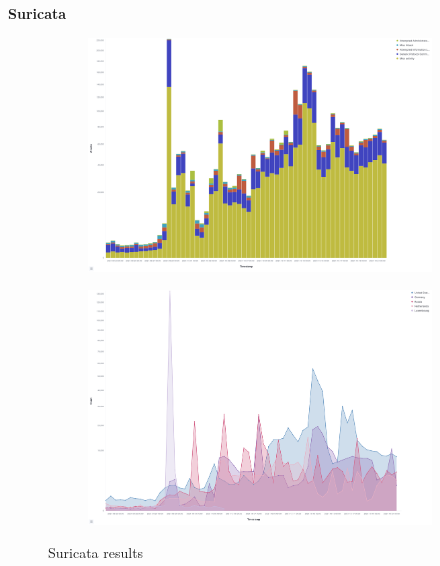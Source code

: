 \textbf{Suricata}

\begin{figure}
    \centering

    \begin{subfigure}[b]{0.49\textwidth}
        \centering
        \includegraphics[width=\textwidth]{figures/tpot-suricata-attacks.png}
        \caption{}
        \label{fig:tpot-suricata-attacks}
    \end{subfigure}
    \hfill
    \begin{subfigure}[b]{0.49\textwidth}
        \centering
        \includegraphics[width=\textwidth]{figures/tpot-suricata-country.png}
        \caption{}
        \label{fig:tpot-suricata-country}
    \end{subfigure}
    \caption[Suricata results]{Suricata results}
    \label{fig:suricata-results}
\end{figure}

